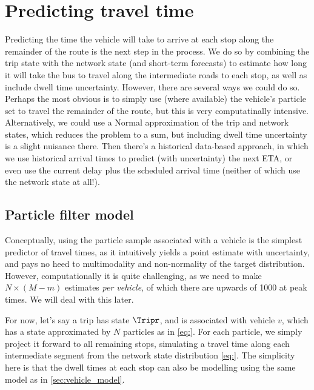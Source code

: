 \section{Predicting travel time}
\label{sec:trip_travel_time}

Predicting the time the vehicle will take to arrive at each stop along the remainder of the route is the next step in the process. We do so by combining the trip state with the network state (and short-term forecasts) to estimate how long it will take the bus to travel along the intermediate roads to each stop, as well as include dwell time uncertainty. However, there are several ways we could do so. Perhaps the most obvious is to simply use (where available) the vehicle's particle set to travel the remainder of the route, but this is very computatinally intensive. Alternatively, we could use a Normal approximation of the trip and network states, which reduces the problem to a sum, but including dwell time uncertainty is a slight nuisance there. Then there's a historical data-based approach, in which we use historical arrival times to predict (with uncertainty) the next ETA, or even use the current delay plus the scheduled arrival time (neither of which use the network state at all!).

% 

\subsection{Particle filter model}
\label{sec:trip_travel_time_pf}

Conceptually, using the particle sample associated with a vehicle is the simplest predictor of travel times, as it intuitively yields a point estimate with uncertainty, and pays no heed to multimodality and non-normality of the target distribution. However, computationally it is quite challenging, as we need to make $N\times(M-m)$ estimates \emph{per vehicle}, of which there are upwards of 1000 at peak times. We will deal with this later.


For now, let's say a trip has state $\Tripr$, and is associated with vehicle $v$, which has a state approximated by $N$ particles as in \cref{eq:}. For each particle, we simply project it forward to all remaining stops, simulating a travel time along each intermediate segment from the network state distribution \cref{eq:}. The simplicity here is that the dwell times at each stop can also be modelling using the same model as in \cref{sec:vehicle_model}.


